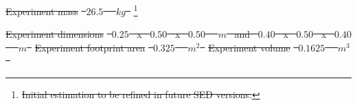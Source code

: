 \documentclass[a4paper,12pt,twoside]{article}
\providecommand{\DIFdeltex}[1]{{\protect\color{red}\sout{#1}}}                      %
\providecommand{\DIFdelbegin}{} %
\providecommand{\DIFdelFL}[1]{\DIFdel{#1}} %
\providecommand{\DIFdel}[1]{\texorpdfstring{\DIFdeltex{#1}}{}} %
\newcommand{\DIFscaledelfig}{0.5}
\newlength{\DIFdelgraphicswidth} %
\newlength{\DIFdelgraphicsheight} %
\newcommand{\DIFdelincludegraphics}[2][]{%
\sbox{\DIFdelgraphicsbox}{\DIFOincludegraphics[#1]{#2}}%
\settoboxwidth{\DIFdelgraphicswidth}{\DIFdelgraphicsbox} %
\settoboxtotalheight{\DIFdelgraphicsheight}{\DIFdelgraphicsbox} %
\scalebox{\DIFscaledelfig}{%
\parbox[b]{\DIFdelgraphicswidth}{\usebox{\DIFdelgraphicsbox}\\[-\baselineskip] \rule{\DIFdelgraphicswidth}{0em}}\llap{\resizebox{\DIFdelgraphicswidth}{\DIFdelgraphicsheight}{%
\setlength{\unitlength}{\DIFdelgraphicswidth}%
\begin{picture}(1,1)%
\thicklines\linethickness{2pt} %
{\color[rgb]{1,0,0}\put(0,0){\framebox(1,1){}}}%
{\color[rgb]{1,0,0}\put(0,0){\line( 1,1){1}}}%
{\color[rgb]{1,0,0}\put(0,1){\line(1,-1){1}}}%
\end{picture}%
}\hspace*{3pt}}} %
} %
\DeclareRobustCommand{\DIFdelbegin}{\DIFOdelbegin \let\includegraphics\DIFdelincludegraphics} %
\begin{document}
\DIFdelbegin %
\DIFdelFL{Experiment mass  }%
\DIFdelFL{\mbox{%
$26.5$
}%
\mbox{%
$kg$
}%
}\footnote[13]{\DIFdelFL{Initial estimation to be refined in future SED versions.}} %
\addtocounter{footnote}{-1}%
\DIFdelFL{Experiment dimensions }%
\DIFdelFL{\mbox{%
$0.25$
}%
x \mbox{%
$0.50$
}%
x \mbox{%
$0.50$
}%
\mbox{%
$m$
}%
and \mbox{%
$0.40$
}%
x \mbox{%
$0.50$
}%
x \mbox{%
$0.40$
}%
\mbox{%
$m$
}%
}%
\DIFdelFL{Experiment footprint area }%
\DIFdelFL{\mbox{%
$0.325$
}%
\mbox{%
$m^2$
}%
}%
\DIFdelFL{Experiment volume  }%
\DIFdelFL{\mbox{%
$0.1625$
}%
\mbox{%
$m^3$
}%
}%
\end{document}
